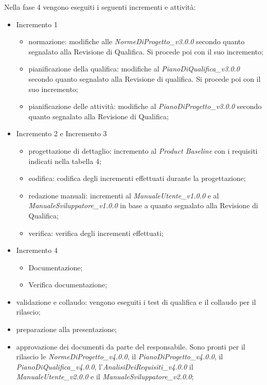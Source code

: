 Nella fase 4 vengono eseguiti i seguenti incrementi e attività:
\begin{itemize}
	\item Incremento 1
			\begin{itemize}
				\item normazione: modifiche alle \textit{NormeDiProgetto\_v3.0.0} secondo quanto segnalato alla Revisione di Qualifica. Si procede poi con il suo incremento;
				\item pianificazione della qualifica: modifiche al \textit{PianoDiQualifica\_v3.0.0} secondo quanto segnalato alla Revisione di qualifica. Si procede poi con il suo incremento;
				\item pianificazione delle attività: modifiche al \textit{PianoDiProgetto\_v3.0.0} secondo quanto segnalato alla Revisione di Qualifica;
			\end{itemize}
	\item Incremento 2 e Incremento 3
		\begin{itemize}
			\item progettazione di dettaglio: incremento al \textit{Product Baseline} con i requisiti indicati nella tabella 4;
			\item codifica: codifica degli incrementi effettuati durante la progettazione;
			\item redazione manuali: incrementi al \textit{ManualeUtente\_v1.0.0} e al \textit{ManualeSviluppatore\_v1.0.0} in base a quanto segnalato alla Revisione di Qualifica;
			\item verifica: verifica degli incrementi effettuati;
		\end{itemize}
	\item Incremento 4
		\begin{itemize}
			\item Documentazione;
			\item Verifica documentazione;
		\end{itemize}
	\item validazione e collaudo: vengono eseguiti i test di qualifica e il collaudo per il rilascio;
	\item preparazione alla presentazione;
	\item approvazione dei documenti da parte del responsabile. Sono pronti per il rilascio le \textit{NormeDiProgetto\_v4.0.0}, il \textit{PianoDiProgetto\_v4.0.0}, il \textit{PianoDiQualifica\_v4.0.0}, l'\textit{AnalisiDeiRequisiti\_v4.0.0} il
	\textit{ManualeUtente\_v2.0.0} e il \textit{ManualeSviluppatore\_v2.0.0};
\end{itemize}

